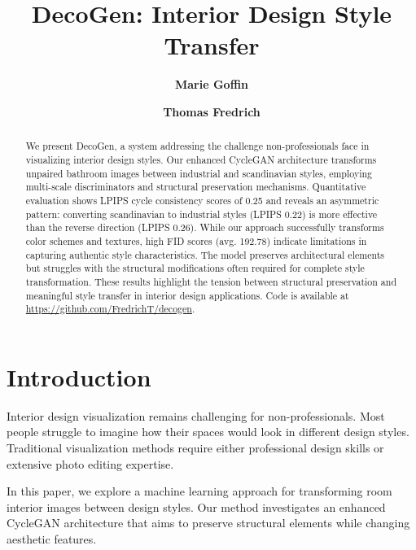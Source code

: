 \documentclass[twocolumn,superscriptaddress,aps]{revtex4-1}
\begin{document}

\title{\Large{DecoGen: Interior Design Style Transfer}}
\vspace{1cm}
\author{\small{\bf Marie Goffin}}
\author{\small{\bf Thomas Fredrich}}

\begin{abstract}
    We present DecoGen, a system addressing the challenge non-professionals face in visualizing interior design styles. Our enhanced CycleGAN architecture transforms unpaired bathroom images between industrial and scandinavian styles, employing multi-scale discriminators and structural preservation mechanisms. Quantitative evaluation shows LPIPS cycle consistency scores of 0.25 and reveals an asymmetric pattern: converting scandinavian to industrial styles (LPIPS 0.22) is more effective than the reverse direction (LPIPS 0.26). While our approach successfully transforms color schemes and textures, high FID scores (avg. 192.78) indicate limitations in capturing authentic style characteristics. The model preserves architectural elements but struggles with the structural modifications often required for complete style transformation. These results highlight the tension between structural preservation and meaningful style transfer in interior design applications. Code is available at \url{https://github.com/FredrichT/decogen}.
\end{abstract}    

\maketitle


\section{Introduction}

Interior design visualization remains challenging for non-professionals. Most people struggle to imagine how their spaces would look in different design styles. Traditional visualization methods require either professional design skills or extensive photo editing expertise.

In this paper, we explore a machine learning approach for transforming room interior images between design styles. Our method investigates an enhanced CycleGAN architecture that aims to preserve structural elements while changing aesthetic features.
\end{document}
